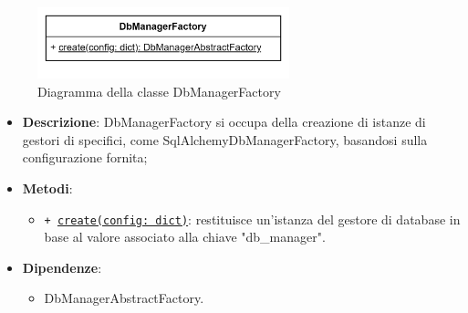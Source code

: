  \label{DbManagerFactory}
\begin{figure}[H]
    \centering
    \includegraphics[width=0.65\textwidth]{assets/Backend/db_manager_factory.png}
    \caption{Diagramma della classe DbManagerFactory}
  \end{figure}
\begin{itemize}
    \item \textbf{Descrizione}: DbManagerFactory si occupa della creazione di istanze di gestori di  specifici, come SqlAlchemyDbManagerFactory, basandosi sulla configurazione fornita;
    \item \textbf{Metodi}:
    \begin{itemize}
        \item \texttt{+ \underline{create(config: dict)}}: restituisce un'istanza del gestore di database in base al valore associato alla chiave "db\_manager".
    \end{itemize}
    \item \textbf{Dipendenze}:
    \begin{itemize}
        \item DbManagerAbstractFactory.
    \end{itemize}
\end{itemize}

